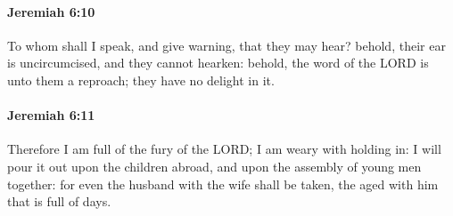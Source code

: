 		\paragraph{Jeremiah 6:10} %
			\label{JEREMIAH-6-10}

			To whom shall I speak, and give warning, that they may hear? behold, their ear is uncircumcised, and they cannot hearken: behold, the word of the LORD is unto them a reproach; they have no delight in it.


		\paragraph{Jeremiah 6:11} %
			\label{JEREMIAH-6-11}

			Therefore I am full of the fury of the LORD; I am weary with holding in: I will pour it out upon the children abroad, and upon the assembly of young men together: for even the husband with the wife shall be taken, the aged with him that is full of days.

